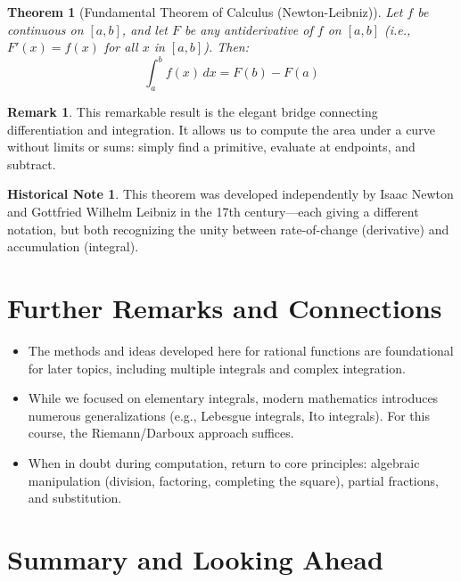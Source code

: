 \documentclass[11pt]{article}
\theoremstyle{definition}
\newtheorem*{remark}{Remark}
\newtheorem*{historicalnote}{Historical Note}
\theoremstyle{plain}
\newtheorem{theorem}{Theorem}[section]
\begin{document}
\begin{theorem}[Fundamental Theorem of Calculus (Newton-Leibniz)]
    Let $f$ be continuous on $[a, b]$, and let $F$ be any antiderivative of $f$ on $[a, b]$ (i.e., $F'(x)=f(x)$ for all $x$ in $[a, b]$). Then:
    \[
        \int_a^b f(x)\,dx = F(b) - F(a)
    \]
\end{theorem}

\begin{remark}
    This remarkable result is the elegant bridge connecting differentiation and integration. It allows us to compute the area under a curve without limits or sums: simply find a primitive, evaluate at endpoints, and subtract.
\end{remark}

\begin{historicalnote}
This theorem was developed independently by Isaac Newton and Gottfried Wilhelm Leibniz in the 17th century—each giving a different notation, but both recognizing the unity between rate-of-change (derivative) and accumulation (integral).
\end{historicalnote}

\section{Further Remarks and Connections}

\begin{itemize}
    \item The methods and ideas developed here for rational functions are foundational for later topics, including multiple integrals and complex integration.
    \item While we focused on elementary integrals, modern mathematics introduces numerous generalizations (e.g., Lebesgue integrals, Ito integrals). For this course, the Riemann/Darboux approach suffices.
    \item When in doubt during computation, return to core principles: algebraic manipulation (division, factoring, completing the square), partial fractions, and substitution.
\end{itemize}

\section*{Summary and Looking Ahead}
\end{document}
